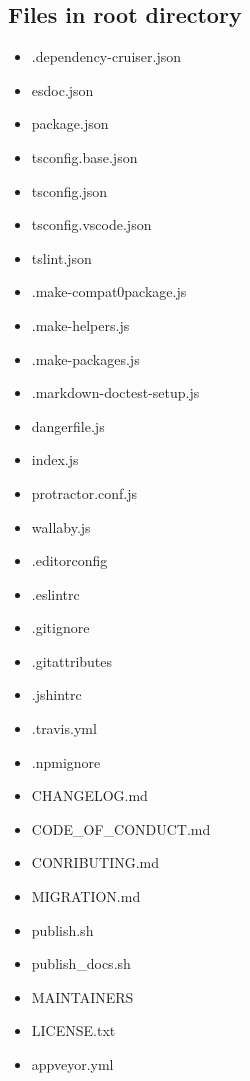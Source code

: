 \subsection{Files in root directory}


\begin{itemize}
  \item .dependency-cruiser.json
  \item esdoc.json
  \item package.json
  \item tsconfig.base.json
  \item tsconfig.json
  \item tsconfig.vscode.json
  \item tslint.json
\end{itemize}


\begin{itemize}
  \item .make-compat0package.js
  \item .make-helpers.js
  \item .make-packages.js
  \item .markdown-doctest-setup.js
  \item dangerfile.js
  \item index.js
  \item protractor.conf.js
  \item wallaby.js
\end{itemize}


\begin{itemize}
  \item .editorconfig
  \item .eslintrc
  \item .gitignore
  \item .gitattributes
  \item .jshintrc
  \item .travis.yml
  \item .npmignore
\end{itemize}


\begin{itemize}
  \item CHANGELOG.md
  \item CODE\_OF\_CONDUCT.md
  \item CONRIBUTING.md
  \item MIGRATION.md
\end{itemize}


\begin{itemize}
  \item publish.sh
  \item publish\_docs.sh
\end{itemize}


\begin{itemize}
  \item MAINTAINERS
  \item LICENSE.txt
  \item appveyor.yml
\end{itemize}
